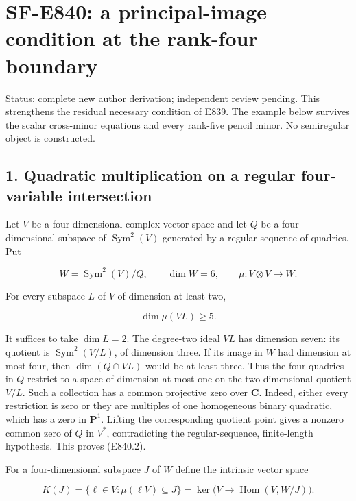 \section{SF-E840: a principal-image condition at the rank-four
boundary}\label{sf-e840-a-principal-image-condition-at-the-rank-four-boundary}

Status: complete new author derivation; independent review pending. This
strengthens the residual necessary condition of E839. The example below
survives the scalar cross-minor equations and every rank-five pencil
minor. No semiregular object is constructed.

\subsection{1. Quadratic multiplication on a regular four-variable
intersection}\label{quadratic-multiplication-on-a-regular-four-variable-intersection}

Let \(V\) be a four-dimensional complex vector space and let \(Q\) be a
four-dimensional subspace of \(\operatorname{Sym}^2(V)\) generated by a
regular sequence of quadrics. Put

\[
 W=\operatorname{Sym}^2(V)/Q,
 \qquad \dim W=6,
 \qquad \mu:V\otimes V\longrightarrow W.
 \tag{E840.1}
\]

For every subspace \(L\) of \(V\) of dimension at least two,

\[
                     \dim\mu(VL)\ge5.
 \tag{E840.2}
\]

It suffices to take \(\dim L=2\). The degree-two ideal \(VL\) has
dimension seven: its quotient is \(\operatorname{Sym}^2(V/L)\), of
dimension three. If its image in \(W\) had dimension at most four, then
\(\dim(Q\cap VL)\) would be at least three. Thus the four quadrics in
\(Q\) restrict to a space of dimension at most one on the
two-dimensional quotient \(V/L\). Such a collection has a common
projective zero over \(\mathbf C\). Indeed, either every restriction is
zero or they are multiples of one homogeneous binary quadratic, which
has a zero in \(\mathbf P^1\). Lifting the corresponding quotient point
gives a nonzero common zero of \(Q\) in \(V^*\), contradicting the
regular-sequence, finite-length hypothesis. This proves (E840.2).

For a four-dimensional subspace \(J\) of \(W\) define the intrinsic
vector space

\[
 K(J)=\{\ell\in V:\mu(\ell V)\subseteq J\}
      =\ker\bigl(V\longrightarrow\operatorname{Hom}(V,W/J)\bigr).
 \tag{E840.3}
\]

